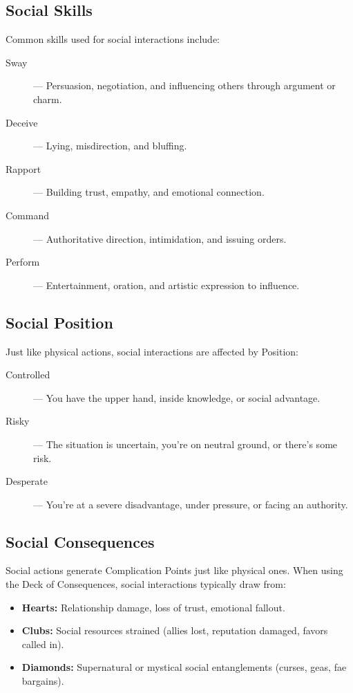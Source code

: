\subsection*{Social Skills}

Common skills used for social interactions include:
\begin{description}
  \item[Sway]  — Persuasion, negotiation, and influencing others through argument or charm.
  \item[Deceive]  — Lying, misdirection, and bluffing.
  \item[Rapport]  — Building trust, empathy, and emotional connection.
  \item[Command]  — Authoritative direction, intimidation, and issuing orders.
  \item[Perform]  — Entertainment, oration, and artistic expression to influence.
\end{description}

\subsection*{Social Position}

Just like physical actions, social interactions are affected by Position:
\begin{description}
  \item[Controlled]  — You have the upper hand, inside knowledge, or social advantage.
  \item[Risky]  — The situation is uncertain, you're on neutral ground, or there's some risk.
  \item[Desperate]  — You're at a severe disadvantage, under pressure, or facing an authority.
\end{description}

\subsection*{Social Consequences}

Social actions generate Complication Points just like physical ones. When using the Deck of Consequences, social interactions typically draw from:
\begin{itemize}
  \item \textbf{Hearts:} Relationship damage, loss of trust, emotional fallout.
  \item \textbf{Clubs:} Social resources strained (allies lost, reputation damaged, favors called in).
  \item \textbf{Diamonds:} Supernatural or mystical social entanglements (curses, geas, fae bargains).
\end{itemize}

